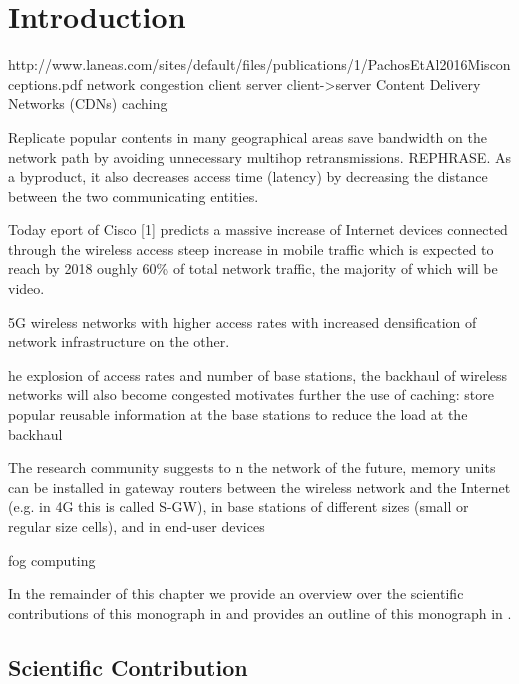 \chapter{Introduction}\label{chap:introduction}
http://www.laneas.com/sites/default/files/publications/1/PachosEtAl2016Misconceptions.pdf
network congestion client server
client->server Content Delivery Networks (CDNs) caching

Replicate popular contents in many geographical areas
save bandwidth on the network path by avoiding unnecessary multihop retransmissions.
REPHRASE. As a byproduct, it also decreases access time (latency) by decreasing the distance between the two communicating entities.

Today eport of Cisco [1] predicts a massive increase of Internet devices connected through the wireless
access
steep increase in mobile traffic which is expected to reach by 2018
oughly 60\% of total network traffic, the majority of which will be video.

5G wireless networks with higher access rates
with increased densification of network infrastructure on the other.

he explosion of access rates
and number of base stations, the backhaul of wireless networks will also become congested motivates further the use of caching: store popular reusable information at the base
stations to reduce the load at the backhaul

The research community suggests to
n the network of the future, memory units can be installed in gateway routers between
the wireless network and the Internet (e.g. in 4G this is called S-GW), in base stations of different
sizes (small or regular size cells), and in end-user devices

fog computing


In the remainder of this chapter we provide an overview over the scientific contributions of this monograph in  and provides an outline of this monograph in .



\section{Scientific Contribution}\label{sec:introduction:scientific_contribution}

